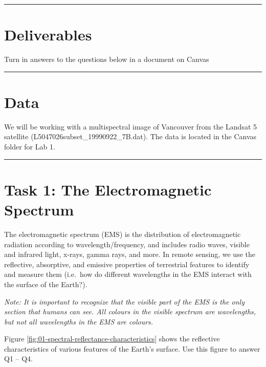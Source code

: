\documentclass[
]{book}
\begin{document}
\begin{center}\rule{0.5\linewidth}{0.5pt}\end{center}

\hypertarget{lab1-deliverables}{%
\section*{Deliverables}\label{lab1-deliverables}}

Turn in answers to the questions below in a document on Canvas

\begin{center}\rule{0.5\linewidth}{0.5pt}\end{center}

\hypertarget{data}{%
\section*{Data}\label{data}}

We will be working with a multispectral image of Vancouver from the Landsat 5 satellite (L5047026subset\_19990922\_7B.dat). The data is located in the Canvas folder for Lab 1.

\begin{center}\rule{0.5\linewidth}{0.5pt}\end{center}

\hypertarget{task-1-the-electromagnetic-spectrum}{%
\section*{Task 1: The Electromagnetic Spectrum}\label{task-1-the-electromagnetic-spectrum}}

The electromagnetic spectrum (EMS) is the distribution of electromagnetic radiation according to wavelength/frequency, and includes radio waves, visible and infrared light, x-rays, gamma rays, and more. In remote sensing, we use the reflective, absorptive, and emissive properties of terrestrial features to identify and measure them (i.e.~how do different wavelengths in the EMS interact with the surface of the Earth?).

\emph{Note: It is important to recognize that the visible part of the EMS is the only section that humans can see. All colours in the visible spectrum are wavelengths, but not all wavelengths in the EMS are colours.}

Figure \ref{fig:01-spectral-reflectance-characteristics} shows the reflective characteristics of various features of the Earth's surface. Use this figure to answer Q1 -- Q4.
\end{document}
